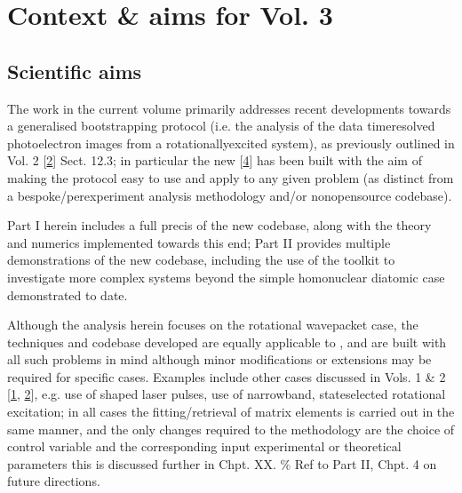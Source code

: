 \documentclass[letterpaper,table,10pt,english]{jupyterBook}
\begin{document}
\section{Context \& aims for Vol. 3}
\label{\detokenize{part1/main_intro_051122:context-aims-for-vol-3}}\label{\detokenize{part1/main_intro_051122:sec-intro-context}}

\subsection{Scientific aims}
\label{\detokenize{part1/main_intro_051122:scientific-aims}}
\sphinxAtStartPar
The work in the current volume primarily addresses recent developments towards a generalised bootstrapping protocol (i.e. the analysis of the data time\sphinxhyphen{}resolved photoelectron images from a rotationally\sphinxhyphen{}excited system), as previously outlined in  Vol. 2 {[}\hyperlink{cite.backmatter/bibliography:id570}{2}{]} Sect. 12.3; in particular the new  {[}\hyperlink{cite.backmatter/bibliography:id574}{4}{]} has been built with the aim of making the protocol easy to use and apply to any given problem (as distinct from a bespoke/per\sphinxhyphen{}experiment analysis methodology and/or non\sphinxhyphen{}open\sphinxhyphen{}source codebase).

\sphinxAtStartPar
Part I herein includes a full precis of the new codebase, along with the theory and numerics implemented towards this end; Part II provides multiple demonstrations of the new codebase, including the use of the toolkit to investigate more complex systems beyond the simple homonuclear diatomic case demonstrated to date.

\sphinxAtStartPar
Although the analysis herein focuses on the rotational wavepacket case, the techniques and codebase developed are equally applicable to , and are built with all such problems in mind \sphinxhyphen{} although minor modifications or extensions may be required for specific cases. Examples include other cases discussed in  Vols. 1 \& 2 {[}\hyperlink{cite.backmatter/bibliography:id569}{1}, \hyperlink{cite.backmatter/bibliography:id570}{2}{]}, e.g. use of shaped laser pulses, use of narrow\sphinxhyphen{}band, state\sphinxhyphen{}selected rotational excitation; in all cases the fitting/retrieval of matrix elements is carried out in the same manner, and the only changes required to the methodology are the choice of control variable and the corresponding input experimental or theoretical parameters \sphinxhyphen{} this is discussed further in Chpt. XX. \% Ref to Part II, Chpt. 4 on future directions.
\end{document}
